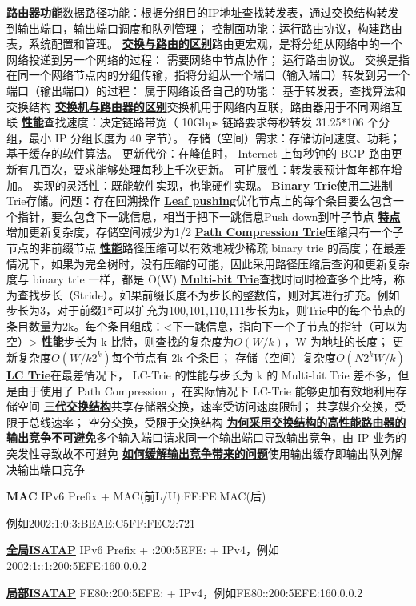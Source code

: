 \documentclass[twocolumn]{ctexart}
\renewcommand{\emph}[1]{\textbf{\underline{#1}}}
\begin{document}
\emph{路由器功能}数据路径功能：根据分组目的IP地址查找转发表，通过交换结构转发到输出端口，输出端口调度和队列管理；
控制面功能：运行路由协议，构建路由表，系统配置和管理。
\emph{交换与路由的区别}路由更宏观，是将分组从网络中的一个网络投递到另一个网络的过程：
需要网络中节点协作；
运行路由协议。
交换是指在同一个网络节点内的分组传输，指将分组从一个端口（输入端口）转发到另一个端口（输出端口）的过程：
属于网络设备自己的功能：
基于转发表，查找算法和交换结构
\emph{交换机与路由器的区别}交换机用于网络内互联，路由器用于不同网络互联
\emph{性能}查找速度：决定链路带宽（ 10Gbps 链路要求每秒转发 31.25*106 个分组，最小 IP 分组长度为 40 字节）。
存储（空间）需求：存储访问速度、功耗；基于缓存的软件算法。
更新代价：在峰值时， Internet 上每秒钟的 BGP 路由更新有几百次，要求能够处理每秒上千次更新。
可扩展性：转发表预计每年都在增加。
实现的灵活性：既能软件实现，也能硬件实现。
\emph{Binary Trie}使用二进制Trie存储。问题：存在回溯操作
\emph{Leaf pushing}优化节点上的每个条目要么包含一个指针，要么包含下一跳信息，相当于把下一跳信息Push down到叶子节点
\emph{特点}增加更新复杂度，存储空间减少为1/2
\emph{Path Compression Trie}压缩只有一个子节点的非前缀节点
\emph{性能}路径压缩可以有效地减少稀疏 binary trie 的高度；在最差情况下，如果为完全树时，没有压缩的可能，因此采用路径压缩后查询和更新复杂度与 binary trie 一样，都是 O(W)
\emph{Multi-bit Trie}查找时同时检查多个比特，称为查找步长（Stride）。如果前缀长度不为步长的整数倍，则对其进行扩充。例如步长为3，对于前缀1*可以扩充为100,101,110,111步长为k，则Trie中的每个节点的条目数量为2k。每个条目组成：<下一跳信息，指向下一个子节点的指针（可以为空）>
\emph{性能}步长为 k 比特，则查找的复杂度为$O(W/k)$，W 为地址的长度；
更新复杂度$O(W/k2^k)$每个节点有 2k 个条目；
存储（空间）复杂度$O(N2^kW/k)$
\emph{LC Trie}在最差情况下， LC-Trie 的性能与步长为 k 的 Multi-bit Trie 差不多，但是由于使用了 Path Compression ，在实际情况下 LC-Trie 能够更加有效地利用存储空间
\emph{三代交换结构}共享存储器交换，速率受访问速度限制；
共享媒介交换，受限于总线速率；
空分交换，受限于交换结构
\emph{为何采用交换结构的高性能路由器的输出竞争不可避免}多个输入端口请求同一个输出端口导致输出竞争，由 IP 业务的突发性导致故不可避免
\emph{如何缓解输出竞争带来的问题}使用输出缓存即输出队列解决输出端口竞争

\textbf{MAC} IPv6 Prefix + MAC(前L/U):FF:FE:MAC(后)

例如2002:1:0:3:BEAE:C5FF:FEC2:721

\emph{全局ISATAP} IPv6 Prefix + :200:5EFE: + IPv4，例如2002:1::1:200:5EFE:160.0.0.2

\emph{局部ISATAP} FE80::200:5EFE: + IPv4，例如FE80::200:5EFE:160.0.0.2
\end{document}
